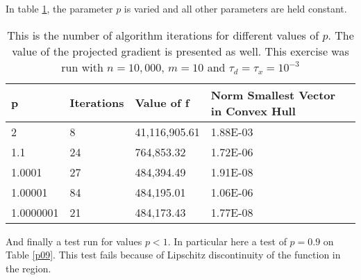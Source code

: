 In table \ref{pmtable}, the parameter $p$ is varied and all other parameters are held constant.

\begin{table}
  \begin{center}
    \begin{tabular}{|l|l|l|p{1.6cm}|p{6cm}|}
      \hline
      p & Iterations & Value of f & Norm Smallest Vector in Convex Hull\\ \hline
      2 & 8 & 41,116,905.61 & 1.88E-03\\
      1.1 & 24 & 764,853.32 & 1.72E-06\\ 
      1.0001 & 27 & 484,394.49 & 1.91E-08 \\ 
      1.00001 & 84 & 484,195.01 & 1.06E-06 \\ 
      1.0000001 & 21 & 484,173.43 & 1.77E-08 \\ \hline
    \end{tabular}
    \caption[Number of algorithm Iterations Changing $p$]{This is the number of algorithm iterations for different values of $p$. The value of the projected gradient is presented as well. This exercise was run with $n = 10,000$, $m = 10$ and $\tau_d = \tau_x = 10^{-3}$}
    \label{pmtable}
  \end{center}
\end{table}

And finally a test run for values $p < 1$. In particular here a test of $p = 0.9$ on Table \ref{p09}. This test fails because of Lipschitz discontinuity of the function in the region.

